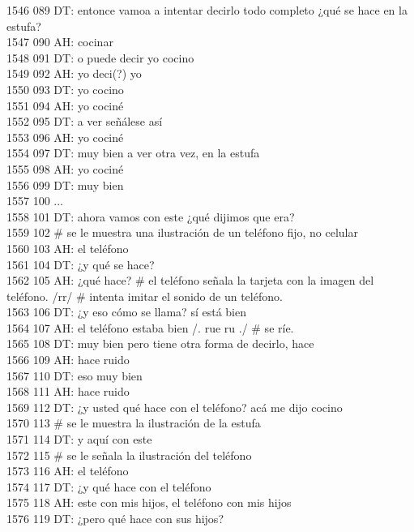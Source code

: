 1546 089 DT: entonce vamoa a intentar decirlo todo completo ¿qué se hace en la estufa?\\
1547 090 AH: cocinar\\
1548 091 DT: o puede decir yo cocino\\
1549 092 AH: yo deci(?) yo\\
1550 093 DT: yo cocino\\
1551 094 AH: yo cociné\\
1552 095 DT: a ver señálese así\\
1553 096 AH: yo cociné\\
1554 097 DT: muy bien a ver otra vez, en la estufa\\
1555 098 AH: yo cociné \\
1556 099 DT: muy bien\\
1557 100 ...\\
1558 101 DT: ahora vamos con este ¿qué dijimos que era?\\
1559 102 # se le muestra una ilustración de un teléfono fijo, no celular\\
1560 103 AH: el teléfono\\
1561 104 DT: ¿y qué se hace?\\
1562 105 AH: ¿qué hace? # el teléfono señala la tarjeta con la imagen del teléfono. /rr/ # intenta imitar el sonido de un teléfono.\\
1563 106 DT: ¿y eso cómo se llama? sí está bien\\
1564 107 AH: el teléfono estaba bien /. rue ru ./ # se ríe.\\
1565 108 DT: muy bien pero tiene otra forma de decirlo, hace\\
1566 109 AH: hace ruido\\
1567 110 DT: eso muy bien\\
1568 111 AH: hace ruido \\
1569 112 DT: ¿y usted qué hace con el teléfono? acá me dijo cocino\\
1570 113 # se le muestra la ilustración de la estufa\\
1571 114 DT: y aquí con este\\
1572 115 # se le señala la ilustración del teléfono\\
1573 116 AH: el teléfono\\
1574 117 DT: ¿y qué hace con el teléfono\\
1575 118 AH: este con mis hijos, el teléfono con mis hijos\\
1576 119 DT: ¿pero qué hace con sus hijos?\\
